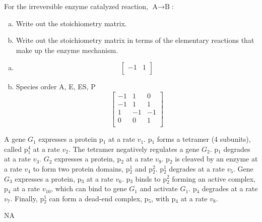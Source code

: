 \documentclass[12pt]{article}
\begin{document}
\begin{question}
For the irreversible enzyme catalyzed reaction, $\text{A} \rightarrow \text{B}$:
\begin{enumerate}[a)]
\item Write out the stoichiometry matrix.

\item Write out the stoichiometry matrix in terms of the elementary reactions that make up the enzyme mechanism.
\end{enumerate}
\end{question}
\begin{solution}
\begin{enumerate}[a)]
\item
\begin{equation*}
       \left[ \begin{array}{rrrr}
         -1 & 1 \\
       \end{array} \right]
\end{equation*}

\item Species order A, E, ES, P
\begin{equation*}
       \left[ \begin{array}{rrrr}
         -1 & 1  &   0  \\
         -1 & 1  &  1  \\
          1 & -1 &   -1  \\
          0 & 0  &   1  \\
       \end{array} \right]
\end{equation*}
\end{enumerate}
\end{solution}


\begin{question}
A gene $G_1$ expresses a protein p$_1$ at a rate $v_1$. p$_1$ forms a tetramer (4 subunits), called p$_1^4$ at a rate
$v_2$. The tetramer negatively regulates a gene $G_2$. p$_1$ degrades at a rate $v_3$. $G_2$ expresses a protein, p$_2$ at a rate $v_9$. p$_2$ is cleaved by an enzyme at a rate $v_4$ to form two protein domains, p$_2^1$ and p$_2^2$. p$_2^1$ degrades at a rate $v_5$. Gene $G_3$ expresses a protein, p$_3$ at a rate $v_6$. p$_3$ binds to p$_2^2$ forming an active complex, p$_4$ at a rate $v_{10}$, which can bind to gene $G_1$ and activate $G_1$. p$_4$ degrades at a rate $v_7$. Finally, p$_2^1$ can form a dead-end complex, p$_5$, with p$_4$ at a rate $v_8$.
\end{question}
\begin{solution}
NA
\end{solution}
\end{document}
